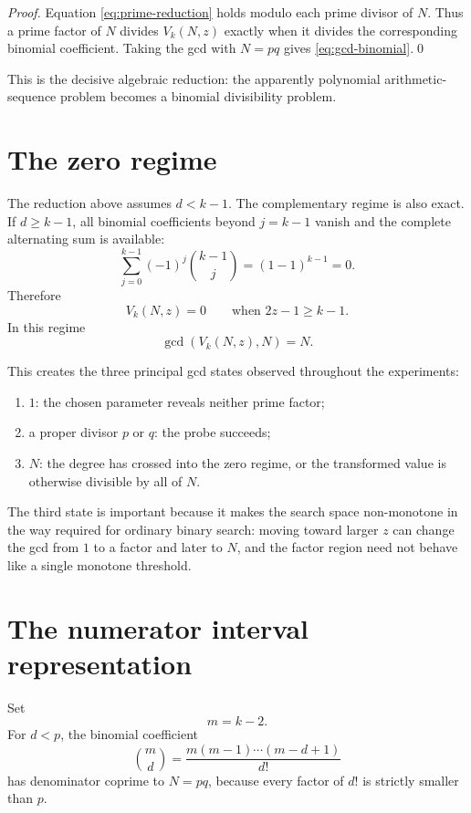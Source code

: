 \documentclass[11pt,a4paper]{article}
\begin{document}
\begin{proof}
Equation \eqref{eq:prime-reduction} holds modulo each prime divisor of $N$. Thus a prime factor of $N$ divides $V_k(N,z)$ exactly when it divides the corresponding binomial coefficient. Taking the gcd with $N=pq$ gives \eqref{eq:gcd-binomial}.\qed
\end{proof}

This is the decisive algebraic reduction: the apparently polynomial arithmetic-sequence problem becomes a binomial divisibility problem.

\section{The zero regime}
\label{sec:zeroregime}

The reduction above assumes $d<k-1$. The complementary regime is also exact. If $d\ge k-1$, all binomial coefficients beyond $j=k-1$ vanish and the complete alternating sum is available:
\[
\sum_{j=0}^{k-1}(-1)^j\binom{k-1}{j}
=(1-1)^{k-1}=0.
\]
Therefore
\begin{equation}
\boxed{
V_k(N,z)=0
\qquad\text{when }2z-1\ge k-1.
}
\label{eq:zero}
\end{equation}
In this regime
\[
\gcd(V_k(N,z),N)=N.
\]

This creates the three principal gcd states observed throughout the experiments:
\begin{enumerate}
\item $1$: the chosen parameter reveals neither prime factor;
\item a proper divisor $p$ or $q$: the probe succeeds;
\item $N$: the degree has crossed into the zero regime, or the transformed value is otherwise divisible by all of $N$.
\end{enumerate}

The third state is important because it makes the search space non-monotone in the way required for ordinary binary search: moving toward larger $z$ can change the gcd from $1$ to a factor and later to $N$, and the factor region need not behave like a single monotone threshold.

\section{The numerator interval representation}
\label{sec:numerator}

Set
\[
m=k-2.
\]
For $d<p$, the binomial coefficient
\[
\binom{m}{d}=\frac{m(m-1)\cdots(m-d+1)}{d!}
\]
has denominator coprime to $N=pq$, because every factor of $d!$ is strictly smaller than $p$.
\end{document}

